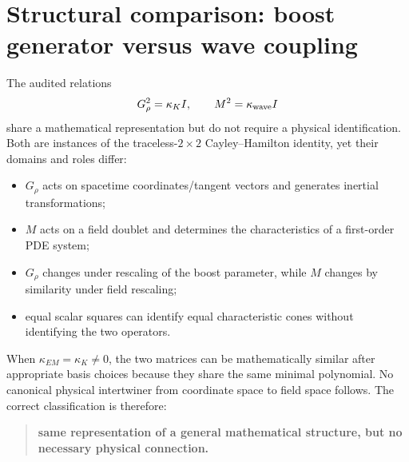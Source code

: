 \documentclass[11pt,a4paper]{article}
\begin{document}
\section{Structural comparison: boost generator versus wave coupling}
The audited relations
\begin{equation}
G_\rho^2=\kappa_K I,
\qquad
M^2=\kappa_{\rm wave}I
\end{equation}
share a mathematical representation but do not require a physical identification. Both are instances of the traceless-$2\times2$ Cayley--Hamilton identity, yet their domains and roles differ:
\begin{itemize}
\item $G_\rho$ acts on spacetime coordinates/tangent vectors and generates inertial transformations;
\item $M$ acts on a field doublet and determines the characteristics of a first-order PDE system;
\item $G_\rho$ changes under rescaling of the boost parameter, while $M$ changes by similarity under field rescaling;
\item equal scalar squares can identify equal characteristic cones without identifying the two operators.
\end{itemize}
When $\kappa_{EM}=\kappa_K\ne0$, the two matrices can be mathematically similar after appropriate basis choices because they share the same minimal polynomial. No canonical physical intertwiner from coordinate space to field space follows. The correct classification is therefore:
\begin{quote}
\textbf{same representation of a general mathematical structure, but no necessary physical connection.}
\end{quote}
\end{document}
